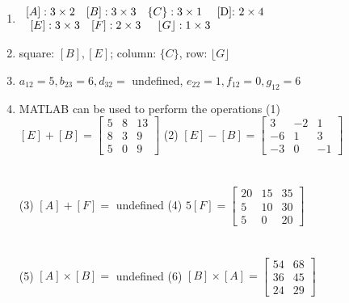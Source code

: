 \documentclass[../main.tex]{subfiles}
\begin{document}
\section{}
\begin{enumerate}[label=\bfseries(\alph*)]
\item $\begin{array}{lllll}[A]: 3 \times 2 & {[B]: 3 \times 3} & \{C\}: 3 \times 1 & \text { [D]: } 2 \times 4\\ &\hspace*{-1.75cm} [E]: 3 \times 3 &\hspace*{-1.75cm} [F]: 2 \times 3 &\hspace*{-1.75cm} \lfloor G\rfloor: 1 \times 3  \\\end{array} $
\bigbreak
\item square: $[B],[E]$; column: $\{C\}$, row: $\lfloor G\rfloor$
\bigbreak
\item $a_{12}=5, b_{23}=6, d_{32}=$ undefined, $e_{22}=1, f_{12}=0, g_{12}=6$
\bigbreak
\item 
MATLAB can be used to perform the operations
\bigbreak
(1) $[E]+[B]=\left[\begin{array}{ccc}5 & 8 & 13 \\ 8 & 3 & 9 \\ 5 & 0 & 9\end{array}\right]$\quad\quad\quad\quad
(2) $[E]-[B]=\left[\begin{array}{ccc}3 & -2 & 1 \\ -6 & 1 & 3 \\ -3 & 0 & -1\end{array}\right]$\\\\\\
(3) $[A]+[F]=$ undefined\quad\quad\quad\quad\quad\quad\quad
(4) $5[F]=\left[\begin{array}{ccc}20 & 15 & 35 \\ 5 & 10 & 30 \\ 5 & 0 & 20\end{array}\right]$\\\\\\
(5) $[A] \times[B]=$ undefined\quad\quad\quad\quad\quad\quad\quad
(6) $[B] \times[A]=\left[\begin{array}{ll}54 & 68 \\ 36 & 45 \\ 24 & 29\end{array}\right]$\\\\\\\\

\end{enumerate}
\end{document}
